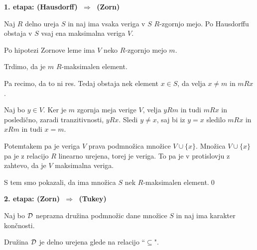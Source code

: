 \documentclass[11pt,paper=b5,DIV=13,headinclude,footinclude]{scrbook}
\def\sledi {{~\Rightarrow~}}
\begin{document}
\bigskip
\textbf{1. etapa: (Hausdorff) $\sledi$ (Zorn)}

Naj $R$ delno ureja $S$ in naj ima vsaka veriga v $S$ $R$-zgornjo mejo.
Po Hausdorffu obstaja v $S$ vsaj ena maksimalna veriga $V$.

Po hipotezi Zornove leme ima $V$ neko $R$-zgornjo mejo $m$.

Trdimo, da je $m$ $R$-maksimalen element.

Pa recimo, da to ni res. Tedaj obstaja nek element $x\in S$, da velja $x\neq m$ in $mRx$.

Naj bo $y\in V$. Ker je $m$ zgornja meja verige $V$, velja $yRm$ in tudi $mRx$ in
posledično, zaradi tranzitivnosti, $yRx$. Sledi $y\neq x$, saj bi iz $y=x$ sledilo $mRx$ in $xRm$ in tudi $x = m$.

Potemtakem pa je veriga $V$ prava podmnožica množice $V\cup \{x\}$. Množica $V\cup \{x\}$ pa je z relacijo $R$ linearno urejena, torej je veriga. To pa je v protislovju z zahtevo, da je $V$ maksimalna veriga.

S tem smo pokazali, da ima množica $S$ nek $R$-maksimalen element.\qed

%
%
%
%
%
\bigskip
\textbf{2. etapa: (Zorn) $\sledi$ (Tukey)}

Naj bo ${\cal D}$ neprazna družina podmnožic dane množice $S$ in naj ima karakter končnosti.

Družina ${\cal D}$ je delno urejena glede na relacijo ``$\subseteq$".
\end{document}
